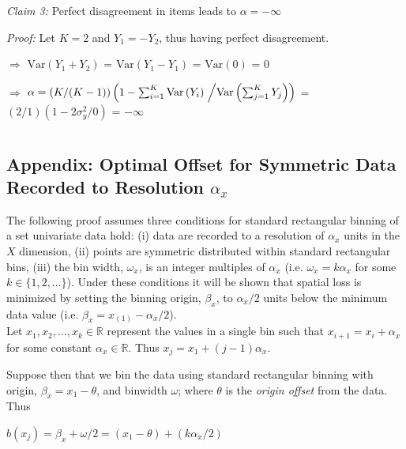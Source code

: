 \documentclass[11pt]{isuthesis}\usepackage[]{graphicx}\usepackage[]{color}
\newcommand{\V}[1]{\text{Var}\left(#1\right)}
\begin{document}
\begin{appendices}
\vspace{.25in} %

\textit{Claim 3:} Perfect disagreement in items leads to $\alpha = -\infty$ 

\textit{Proof:} Let $K=2$ and $Y_1 = -Y_2$, thus having perfect disagreement.

$\Rightarrow$  $\V{Y_1 + Y_2}$ = $\V{Y_1 - Y_1}$ = $\V{0}$ = $0$

$\Rightarrow$  $\alpha = \left(K/(K-1)\right) \left( 1- \sum_{i=1}^K \V{Y_i} \right.\left/  \V{\sum_{j=1}^K Y_j}  \right)$ = $(2/1)(1-2\sigma^2_y/0)$ = $-\infty$ 





\chapter{ }

\section{Appendix: Optimal Offset for Symmetric Data Recorded to Resolution $\alpha_x$}
\label{proof:offset}
The following proof assumes three conditions for standard rectangular binning of a set univariate data hold: (i) data are recorded to a resolution of $\alpha_x$ units in the $X$ dimension, (ii) points are symmetric distributed within standard rectangular bins, (iii) the bin width, $\omega_x$, is an integer multiples of $\alpha_x$ (i.e. $\omega_x = k\alpha_x$ for some $k \in \{1,2,\dots\}$).  Under these conditions it will be shown that spatial loss is minimized by setting the binning origin, $\beta_x$, to $\alpha_x/2$ units below the minimum data value (i.e. $\beta_x = x_{(1)} - \alpha_x/2$).\\

Let $x_1, x_2, \dots, x_k \in \mathbb{R}$ represent the values in a single bin such that $x_{i+1} = x_i + \alpha_x$ for some constant $\alpha_x \in \mathbb{R}$. Thus $x_j = x_1 + (j-1)\alpha_x$.

Suppose then that we bin the data using standard rectangular binning with origin, $\beta_x = x_1 - \theta$, and binwidth $\omega$; where $\theta$ is the \textit{origin offset} from the data. Thus 

$b(x_j) = \beta_x + \omega/2 = (x_1 - \theta) + (k\alpha_x/2)$


\end{appendices}
\end{document}
